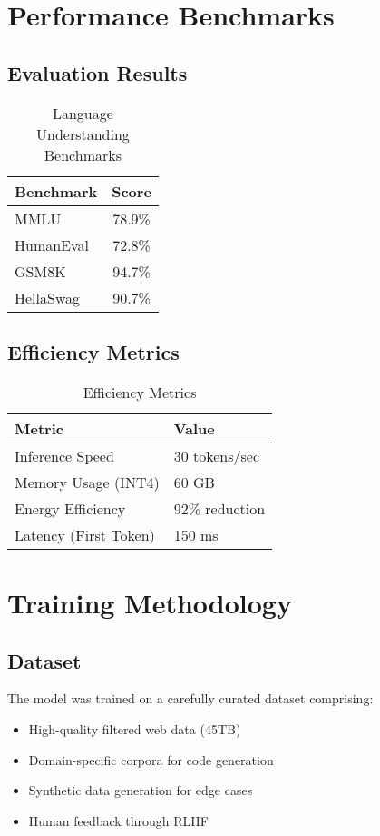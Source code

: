 \documentclass[11pt,a4paper]{article}
\begin{document}
\section{Performance Benchmarks}

\subsection{Evaluation Results}


\begin{table}[H]
\centering
\begin{tabular}{lc}
\toprule
\textbf{Benchmark} & \textbf{Score} \\
\midrule
MMLU & 78.9\% \\
HumanEval & 72.8\% \\
GSM8K & 94.7\% \\
HellaSwag & 90.7\% \\
\bottomrule
\end{tabular}
\caption{Language Understanding Benchmarks}
\end{table}

\subsection{Efficiency Metrics}

\begin{table}[H]
\centering
\begin{tabular}{ll}
\toprule
\textbf{Metric} & \textbf{Value} \\
\midrule
Inference Speed & 30 tokens/sec \\
Memory Usage (INT4) & 60 GB \\
Energy Efficiency & 92\% reduction \\
Latency (First Token) & 150 ms \\
\bottomrule
\end{tabular}
\caption{Efficiency Metrics}
\end{table}

\section{Training Methodology}

\subsection{Dataset}
The model was trained on a carefully curated dataset comprising:
\begin{itemize}
    \item High-quality filtered web data (45TB)
    \item Domain-specific corpora for code generation
    \item Synthetic data generation for edge cases
    \item Human feedback through RLHF
\end{itemize}
\end{document}
